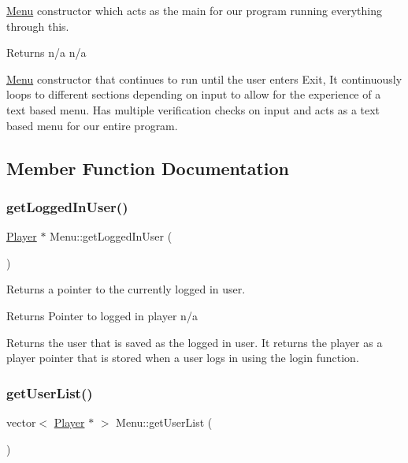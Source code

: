 \hyperlink{classMenu}{Menu} constructor which acts as the main for our program running everything through this. 

\begin{DoxyReturn}{Returns}
n/a  n/a
\end{DoxyReturn}
\hyperlink{classMenu}{Menu} constructor that continues to run until the user enters Exit, It continuously loops to different sections depending on input to allow for the experience of a text based menu. Has multiple verification checks on input and acts as a text based menu for our entire program. 

\subsection{Member Function Documentation}
\mbox{\label{classMenu_a8a89cf8a328d06d20edf1a807865c8f6}} 
\subsubsection{\texorpdfstring{get\+Logged\+In\+User()}{getLoggedInUser()}}
{\footnotesize\ttfamily \hyperlink{classPlayer}{Player} $\ast$ Menu\+::get\+Logged\+In\+User (\begin{DoxyParamCaption}{ }\end{DoxyParamCaption})}



Returns a pointer to the currently logged in user. 

\begin{DoxyReturn}{Returns}
Pointer to logged in player  n/a
\end{DoxyReturn}
Returns the user that is saved as the logged in user. It returns the player as a player pointer that is stored when a user logs in using the login function. \mbox{\label{classMenu_a1a6c905c9a2bcb5bed082baeb2d4929a}} 
\subsubsection{\texorpdfstring{get\+User\+List()}{getUserList()}}
{\footnotesize\ttfamily vector$<$ \hyperlink{classPlayer}{Player} $\ast$ $>$ Menu\+::get\+User\+List (\begin{DoxyParamCaption}{ }\end{DoxyParamCaption})}



